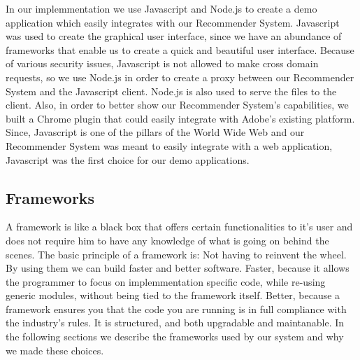 In our implemmentation we use Javascript and Node.js to create a demo application which easily integrates with our Recommender System. Javascript was used to create the graphical user interface, since we have an abundance of frameworks that enable us to create a quick and beautiful user interface. Because of various security issues, Javascript is not allowed to make cross domain requests, so we use Node.js in order to create a proxy between our Recommender System and the Javascript client. Node.js is also used to serve the files to the client.
Also, in order to better show our Recommender System's capabilities, we built a Chrome plugin that could easily integrate with Adobe's existing platform.
Since, Javascript is one of the pillars of the World Wide Web and our Recommender System was meant to easily integrate with a web application, Javascript was the first choice for our demo applications.


\subsection{Frameworks}
\label{sec:frameworks}
A framework is like a black box that offers certain functionalities to it's user and does not require him to have any knowledge of what is going on behind the scenes.
The basic principle of a framework is: Not having to reinvent the wheel. By using them we can build faster and better software.
Faster, because it allows the programmer to focus on implemmentation specific code, while re-using generic modules, without being tied to the framework itself.
Better, because a framework ensures you that the code you are running is in full compliance with the industry's rules. It is structured, and both upgradable and maintanable.
In the following sections we describe the frameworks used by our system and why we made these choices.

